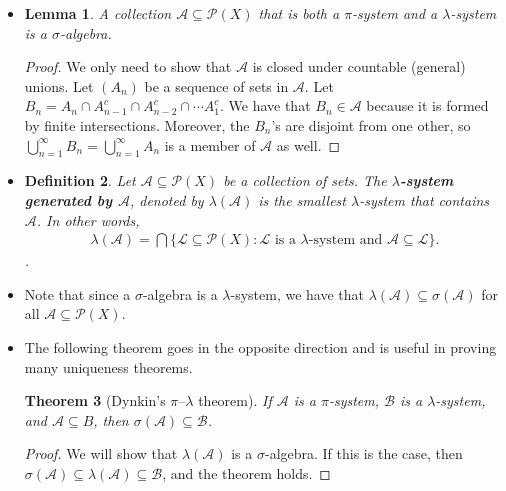 \documentclass[10pt]{article}
\newtheorem{lemma}{Lemma}
\newtheorem{theorem}[lemma]{Theorem}
\newtheorem{definition}[lemma]{Definition}
\newcommand{\mcal}[1]{\mathcal{#1}}
\begin{document}
\begin{itemize}
  \item \begin{lemma}
    A collection $\mcal{A} \subseteq \mcal{P}(X)$ that is both a $\pi$-system and a $\lambda$-system is a $\sigma$-algebra.
  \end{lemma}

  \begin{proof}
    We only need to show that $\mcal{A}$ is closed under countable (general) unions. Let $(A_n)$ be a sequence of sets in $\mcal{A}$. Let $B_n = A_n \cap A_{n-1}^c \cap A_{n-2}^c \cap \dotsb A_1^c$. We have that $B_n \in \mcal{A}$ because it is formed by finite intersections. Moreover, the $B_n$'s are disjoint from one other, so $\bigcup_{n=1}^\infty B_n = \bigcup_{n=1}^\infty A_n$ is a member of $\mcal{A}$ as well.
  \end{proof}

  \item \begin{definition}
    Let $\mcal{A} \subseteq \mcal{P}(X)$ be a collection of sets. The {\bf $\lambda$-system generated by $\mcal{A}$}, denoted by $\lambda(\mcal{A})$ is the smallest $\lambda$-system that contains $\mcal{A}$. In other words,
    \begin{align*}
      \lambda(\mcal{A}) = \bigcap \bigg\{ \mcal{L} \subseteq \mcal{P}(X): \mbox{$\mcal{L}$ is a $\lambda$-system and $\mcal{A} \subseteq \mcal{L}$} \bigg\}.
    \end{align*}.
  \end{definition}

  \item Note that since a $\sigma$-algebra is a $\lambda$-system, we have that $\lambda(\mcal{A}) \subseteq \sigma(\mcal{A})$ for all $\mcal{A} \subseteq \mcal{P}(X)$.

  \item The following theorem goes in the opposite direction and is useful in proving many uniqueness theorems.
  
  \begin{theorem}[Dynkin's $\pi$--$\lambda$ theorem] \label{theorem:dynkin-lambda-pi}
    If $\mcal{A}$ is a $\pi$-system, $\mcal{B}$ is a $\lambda$-system, and $\mcal{A} \subseteq B$, then $\sigma(\mcal{A}) \subseteq \mcal{B}$.
  \end{theorem}

  \begin{proof}
    We will show that $\lambda(\mcal{A})$ is a $\sigma$-algebra. If this is the case, then $\sigma(\mcal{A}) \subseteq \lambda(\mcal{A}) \subseteq \mcal{B}$, and the theorem holds.


\end{proof}
\end{itemize}
\end{document}
